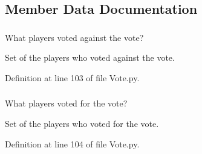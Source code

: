 \subsection{Member Data Documentation}
\hypertarget{class_vote_1_1_vote_ad28b3d5cd63141ad2e23a900927724e6}{
\subsubsection[{\_\-\_\-players\_\-voted\_\-no}]{}}
\label{class_vote_1_1_vote_ad28b3d5cd63141ad2e23a900927724e6}


What players voted against the vote? 

Set of the players who voted against the vote. 

Definition at line 103 of file Vote.py.

\hypertarget{class_vote_1_1_vote_a6a3289f868e2d8898c27e6905fe68e19}{
\subsubsection[{\_\-\_\-players\_\-voted\_\-yes}]{}}
\label{class_vote_1_1_vote_a6a3289f868e2d8898c27e6905fe68e19}


What players voted for the vote? 

Set of the players who voted for the vote. 

Definition at line 104 of file Vote.py.

\hypertarget{class_vote_1_1_vote_a7540d71a94e58d4a4877a8a949232fe3}{
\subsubsection[{action}]{}}
\label{class_vote_1_1_vote_a7540d71a94e58d4a4877a8a949232fe3}


